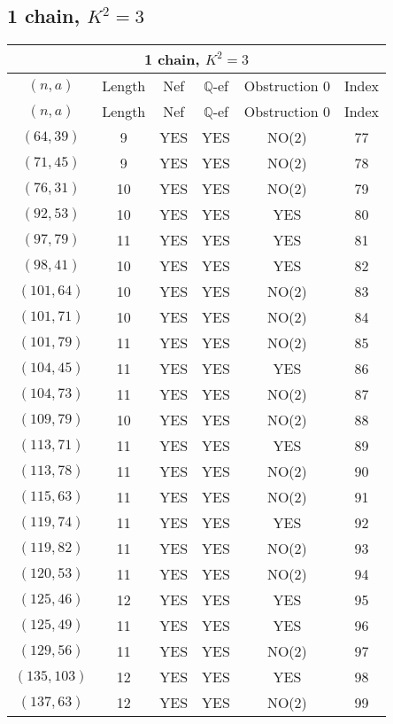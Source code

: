 \subsection{1 chain, $K^2 = 3$}
\begin{longtable}{|c|c|c|c|c|c|}
\hline
\multicolumn{6}{|c|}{1 chain, $K^2 = 3$}\\
\hline
$(n,a)$ & Length & Nef & $\mathbb Q$-ef & Obstruction 0 & Index\\
\hline
\endfirsthead

\hline
$(n,a)$ & Length & Nef & $\mathbb Q$-ef & Obstruction 0 & Index\\
\hline
\endhead
\hline
\endfoot

$(64, 39)$ & 9 & YES & YES & NO(2) & 77\\
$(71, 45)$ & 9 & YES & YES & NO(2) & 78\\
$(76, 31)$ & 10 & YES & YES & NO(2) & 79\\
$(92, 53)$ & 10 & YES & YES & YES & 80\\
$(97, 79)$ & 11 & YES & YES & YES & 81\\
$(98, 41)$ & 10 & YES & YES & YES & 82\\
$(101, 64)$ & 10 & YES & YES & NO(2) & 83\\
$(101, 71)$ & 10 & YES & YES & NO(2) & 84\\
$(101, 79)$ & 11 & YES & YES & NO(2) & 85\\
$(104, 45)$ & 11 & YES & YES & YES & 86\\
$(104, 73)$ & 11 & YES & YES & NO(2) & 87\\
$(109, 79)$ & 10 & YES & YES & NO(2) & 88\\
$(113, 71)$ & 11 & YES & YES & YES & 89\\
$(113, 78)$ & 11 & YES & YES & NO(2) & 90\\
$(115, 63)$ & 11 & YES & YES & NO(2) & 91\\
$(119, 74)$ & 11 & YES & YES & YES & 92\\
$(119, 82)$ & 11 & YES & YES & NO(2) & 93\\
$(120, 53)$ & 11 & YES & YES & NO(2) & 94\\
$(125, 46)$ & 12 & YES & YES & YES & 95\\
$(125, 49)$ & 11 & YES & YES & YES & 96\\
$(129, 56)$ & 11 & YES & YES & NO(2) & 97\\
$(135, 103)$ & 12 & YES & YES & YES & 98\\
$(137, 63)$ & 12 & YES & YES & NO(2) & 99\\

\end{longtable}
